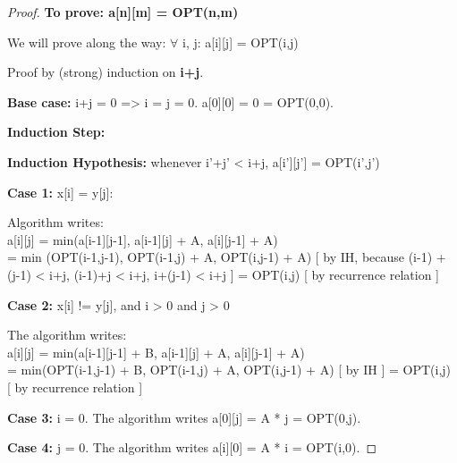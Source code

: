 \documentclass[openany]{article}
\begin{document}
\begin{proof}{}{}
\textbf{To prove: a[n][m] = OPT(n,m)}

We will prove along the way: $\forall$ i, j: a[i][j] = OPT(i,j)

Proof by (strong) induction on \textbf{i+j}.

\textbf{Base case:} i+j = 0 => i = j = 0. a[0][0] = 0 = OPT(0,0).

\textbf{Induction Step:}

\textbf{Induction Hypothesis:} whenever i'+j' < i+j, a[i'][j'] = OPT(i',j')

\qquad \textbf{Case 1:} x[i] = y[j]:

Algorithm writes:\\ a[i][j] = min(a[i-1][j-1], a[i-1][j] + A, a[i][j-1] + A)\\= min (OPT(i-1,j-1), OPT(i-1,j) + A, OPT(i,j-1) + A)
[ by IH, because (i-1) + (j-1) < i+j, (i-1)+j < i+j, i+(j-1) < i+j ] = OPT(i,j) [ by recurrence relation ]

\qquad \textbf{Case 2:} x[i] != y[j], and i > 0 and j > 0

The algorithm writes:\\a[i][j] = min(a[i-1][j-1] + B, a[i-1][j] + A, a[i][j-1] + A) \\= min(OPT(i-1,j-1) + B, OPT(i-1,j) + A, OPT(i,j-1) + A) [ by IH ]
= OPT(i,j) [ by recurrence relation ]

\qquad \textbf{Case 3:} i = 0. The algorithm writes a[0][j] = A * j = OPT(0,j).

\qquad \textbf{Case 4:} j = 0. The algorithm writes a[i][0] = A * i = OPT(i,0).

\end{proof}
    

        

\end{document}
